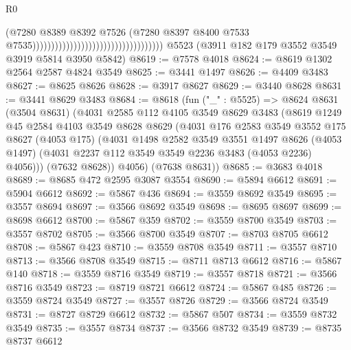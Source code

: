 \begin{lexlean}{R0}
\begin{coremodule}
                                                                      (@7280
                                                                        @8389
                                                                        @8392
                                                                        @7526
                                                                        (@7280
                                                                          @8397
                                                                          @8400
                                                                          @7533
                                                                          @7535)))))))))))))))))))))))))))))))))))
    @5523
    (@3911 @182 @179 @3552 @3549 @3919 @5814 @3950 @5842)
@8619 := @7578 @4018
@8624 := @8619 @1302 @2564 @2587 @4824 @3549
@8625 := @3441 @1497
@8626 := @4409 @3483
@8627 := @8625 @8626
@8628 := @3917 @8627
@8629 := @3440 @8628
@8631 := @3441 @8629 @3483
@8684 := @8618
    (fun ("_" : @5525) =>
    @8624
      @8631
      (@3504 @8631)
      (@4031
        @2585
        @112
        @4105
        @3549
        @8629
        @3483
        (@8619
          @1249
          @45
          @2584
          @4103
          @3549
          @8628
          @8629
          (@4031
            @176
            @2583
            @3549
            @3552
            @175
            @8627
            (@4053 @175)
            (@4031
              @1498
              @2582
              @3549
              @3551
              @1497
              @8626
              (@4053 @1497)
              (@4031 @2237 @112 @3549 @3549 @2236 @3483 (@4053 @2236) @4056)))
          (@7632 @8628))
        @4056)
      (@7638 @8631))
@8685 := @3683 @4018
@8689 := @8685 @472 @2595 @3087 @3554
@8690 := @5894 @6612
@8691 := @5904 @6612
@8692 := @5867 @436
@8694 := @3559 @8692 @3549
@8695 := @3557 @8694
@8697 := @3566 @8692 @3549
@8698 := @8695 @8697
@8699 := @8698 @6612
@8700 := @5867 @359
@8702 := @3559 @8700 @3549
@8703 := @3557 @8702
@8705 := @3566 @8700 @3549
@8707 := @8703 @8705 @6612
@8708 := @5867 @423
@8710 := @3559 @8708 @3549
@8711 := @3557 @8710
@8713 := @3566 @8708 @3549
@8715 := @8711 @8713 @6612
@8716 := @5867 @140
@8718 := @3559 @8716 @3549
@8719 := @3557 @8718
@8721 := @3566 @8716 @3549
@8723 := @8719 @8721 @6612
@8724 := @5867 @485
@8726 := @3559 @8724 @3549
@8727 := @3557 @8726
@8729 := @3566 @8724 @3549
@8731 := @8727 @8729 @6612
@8732 := @5867 @507
@8734 := @3559 @8732 @3549
@8735 := @3557 @8734
@8737 := @3566 @8732 @3549
@8739 := @8735 @8737 @6612

\end{coremodule}
\end{lexlean}

